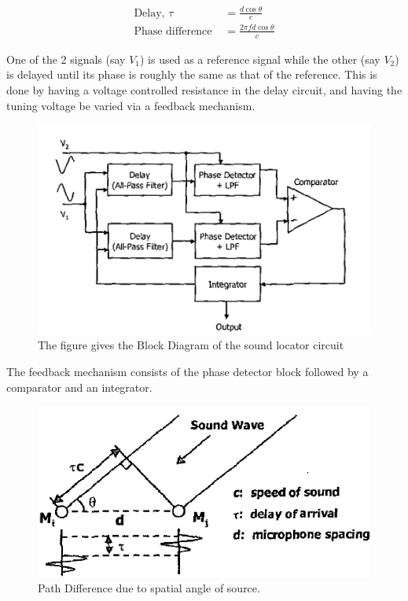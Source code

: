 \documentclass[]{risa}
\begin{document}

\begin{align*}
    \text{Delay, }\tau &= \frac{d\cos{\theta}}{c}\\
    \text{Phase difference }&= \frac{2\pi f d\cos{\theta} }{c}
\end{align*}

One of the 2 signals (say $V_1$) is used as a reference signal while the other (say $V_2$) is delayed until its phase is roughly the same as that of the reference. This is done by having a voltage controlled resistance in the delay circuit, and having the tuning voltage be varied via a feedback mechanism.
\begin{figure}[hbp]
\includegraphics[width=\columnwidth]{block_cir.PNG}
\caption{The figure gives the Block Diagram of the sound locator circuit}
\label{fig:block_cir}
\end{figure}
The feedback mechanism consists of the phase detector block followed by a comparator and an integrator.

\begin{figure}[hbp]
\includegraphics[width=\columnwidth]{SpatialAngle.jpg}
\caption{Path Difference due to spatial angle of source.}
\label{fig:spatial_angle}
\end{figure}
\end{document}
